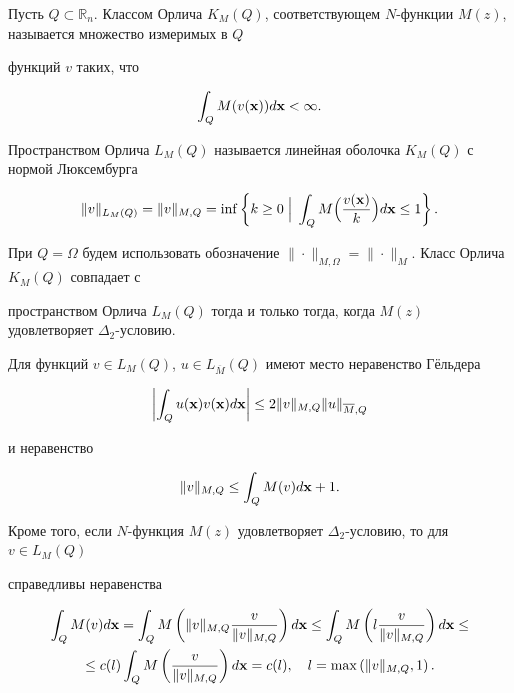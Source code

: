 Пусть $Q\subset\mathbb{R}_n$. Классом Орлича $K_M(Q)$, соответствующем $N$-функции $M(z)$, называется множество измеримых в $Q$

функций $v$ таких, что

$$

\int_Q M(v({\bf x}))d{\bf x}<\infty.

 $$

Пространством Орлича $L_M(Q)$ называется линейная оболочка $K_M(Q)$  с нормой Люксембурга

$$

 \|v\|_{L_{M}(Q)}=\|v\|_{M,Q}=\inf\left\{k\geq 0 \;\Big | \; \int_{Q}M\Bigl(\frac{v(\mathbf{x})}{k}\Bigr) d{\mathbf{ x}}\leq1\right\}.

$$

При $Q=\Omega$ будем использовать обозначение $\|\cdot\|_{M,\Omega}=\|\cdot\|_M$.  Класс Орлича $K_M(Q)$ совпадает с

пространством Орлича $L_M(Q)$ тогда и только тогда, когда $M(z)$ удовлетворяет $\Delta_2$-условию.



Для функций $v\in L_{M}(Q)$, $u\in {L}_{\overline {M}}(Q)$ имеют место неравенство Гёльдера

 \begin{equation}\label{eq:Kozh:gel}

\left | \int_Q u({\bf x})v({\bf x})d{\bf x}\right|\leq 2\|v\|_{M,Q}\|u\|_{\overline {M},Q}

\end{equation}

и  неравенство

\begin{equation}\label{eq:Kozh:ner_1}

\|v\|_{M,Q}\leq\int_{Q}M(v)d{\bf x}+1.

\end{equation}

Кроме того, если $N$-функция $M(z)$ удовлетворяет $\Delta_2$-условию, то для $v\in L_M(Q)$

справедливы неравенства

\begin{multline}\label{eq:Kozh:ner_2}

 \int_Q M(v)d{\bf x}=\int_Q M\left(\|v\|_{M,Q}\frac{v}{\|v\|_{M,Q}}\right)d{\bf

 x}\leq\int_Q M\left(l\frac{v}{\|v\|_{M,Q}}\right)d{\bf x}\leq

\\

\leq

 c(l)\int_Q M\left(\frac{v}{\|v\|_{M,Q}}\right)d{\bf x}= c(l),\quad

 l=\max\left(\|v\|_{M,Q}, 1\right).

\end{multline}




